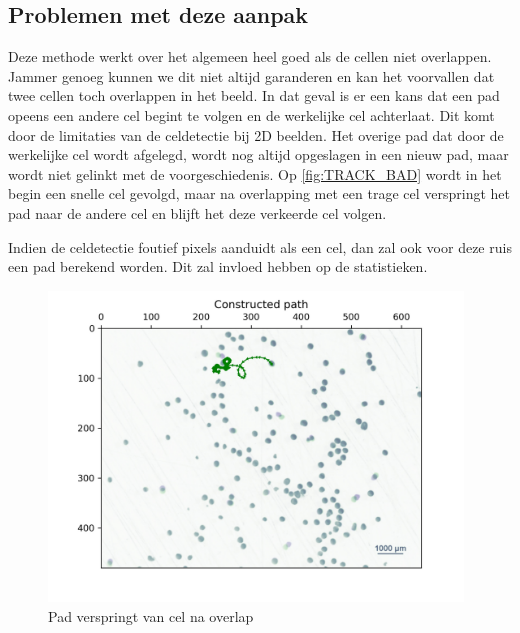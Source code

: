 \documentclass{article}
\begin{document}
\begin{multicols}{2}
\subsection{Problemen met deze aanpak}
\label{sec:tracking_problemen}
Deze methode werkt over het algemeen heel goed als de cellen niet overlappen. Jammer genoeg kunnen we dit niet altijd garanderen en kan het voorvallen dat twee cellen toch overlappen in het beeld. In dat geval is er een kans dat een pad opeens een andere cel begint te volgen en de werkelijke cel achterlaat. Dit komt door de limitaties van de celdetectie bij 2D beelden. Het overige pad dat door de werkelijke cel wordt afgelegd, wordt nog altijd opgeslagen in een nieuw pad, maar wordt niet gelinkt met de voorgeschiedenis. Op \autoref{fig:TRACK_BAD} wordt in het begin een snelle cel gevolgd, maar na overlapping met een trage cel verspringt het pad naar de andere cel en blijft het deze verkeerde cel volgen.

Indien de celdetectie foutief pixels aanduidt als een cel, dan zal ook voor deze ruis een pad berekend worden. Dit zal invloed hebben op de statistieken.
\begin{figure}[H]
\centering
\includegraphics[width=0.98\textwidth]{images/badpath.jpg}
\caption{\label{fig:TRACK_BAD}Pad verspringt van cel na overlap}
\end{figure}

\end{multicols}
\end{document}
